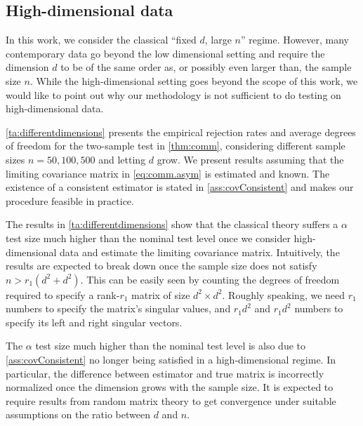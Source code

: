 \documentclass[12pt]{article}
\numberwithin{equation}{section}
\numberwithin{table}{section}
\numberwithin{thm}{section}
\numberwithin{defn}{section}
\numberwithin{lem}{section}
\numberwithin{prop}{section}
\numberwithin{cor}{section}
\numberwithin{rem}{section}
\begin{document}
\begin{appendix}
\subsection{High-dimensional data} \label{se:compl3}

In this work, we consider the classical ``fixed $d$, large $n$” regime. However, many contemporary data go beyond the low dimensional setting and require the dimension $d$ to be of the same order as, or possibly even larger than, the sample size $n$.
While the high-dimensional setting goes beyond the scope of this work, we would like to point out why our methodology is not sufficient to do testing on high-dimensional data.

\autoref{ta:differentdimensions} presents the empirical rejection rates and average degrees of freedom for the two-sample test in \autoref{thm:comm}, considering different sample sizes $n=50, 100, 500$ and letting $d$ grow. We present results assuming that the limiting covariance matrix in \eqref{eq:comm.asym} is estimated and known. The existence of a consistent estimator is stated in \autoref{ass:covConsistent} and makes our procedure feasible in practice.

The results in \autoref{ta:differentdimensions} show that the classical theory suffers a $\alpha$ test size much higher than the nominal test level once we consider high-dimensional data and estimate the limiting covariance matrix. Intuitively, the results are expected to break down once the sample size does not satisfy $n > r_{1}(d^2 + d^2)$. This can be easily seen by counting the degrees of freedom required to specify a rank-$r_{1}$ matrix of size $d^2 \times d^2$. Roughly speaking, we need $r_{1}$ numbers to specify the matrix's singular values, and $r_{1}d^2$ and $r_{1}d^2$ numbers to specify its left and right singular vectors.

The $\alpha$ test size much higher than the nominal test level is also due to \autoref{ass:covConsistent} no longer being satisfied in a high-dimensional regime. In particular, the difference between estimator and true matrix is incorrectly normalized once the dimension grows with the sample size. It is expected to require results from random matrix theory to get convergence under suitable assumptions on the ratio between $d$ and $n$. 



\end{appendix}
\end{document}
